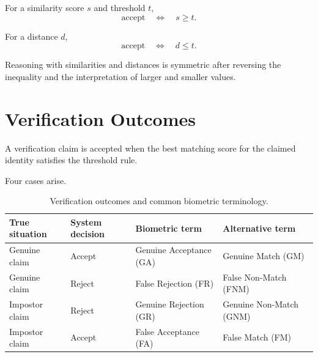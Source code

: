 \documentclass[11pt,a4paper,oneside]{report}
\begin{document}
For a similarity score \(s\) and threshold \(t\),
\begin{equation}
\text{accept}
\quad\Longleftrightarrow\quad
s \geq t.
\label{eq:similarity-rule}
\end{equation}

For a distance \(d\),
\begin{equation}
\text{accept}
\quad\Longleftrightarrow\quad
d \leq t.
\label{eq:distance-rule}
\end{equation}

Reasoning with similarities and distances is symmetric after reversing
the inequality and the interpretation of larger and smaller values.

\section{Verification Outcomes}
\label{subsec:verification-outcomes}

A verification claim is accepted when the best matching score for the
claimed identity satisfies the threshold rule.

Four cases arise.

\begin{table}[htbp]
\centering
\caption{Verification outcomes and common biometric terminology.}
\label{tab:verification-outcomes}
\small

\begin{tabular}{
    P{3.0cm}
    P{2.55cm}
    P{4.15cm}
    P{4.15cm}
}
\toprule

\textbf{True situation} &
\textbf{System decision} &
\textbf{Biometric term} &
\textbf{Alternative term}
\\

\midrule

Genuine claim &
Accept &
Genuine Acceptance (GA) &
Genuine Match (GM)
\\

Genuine claim &
Reject &
False Rejection (FR) &
False Non-Match (FNM)
\\

Impostor claim &
Reject &
Genuine Rejection (GR) &
Genuine Non-Match (GNM)
\\

Impostor claim &
Accept &
False Acceptance (FA) &
False Match (FM)
\\

\bottomrule
\end{tabular}

\end{table}
\end{document}
